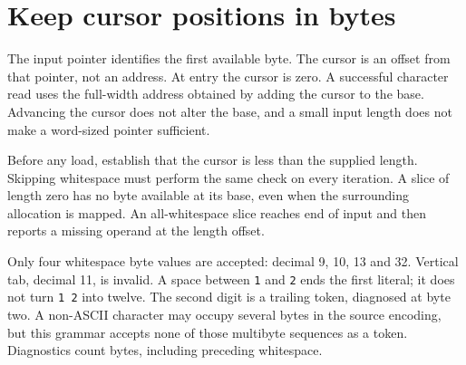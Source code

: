 \section{Keep cursor positions in bytes}\label{expression-bytes}
The input pointer identifies the first available byte. The cursor is an offset
from that pointer, not an address. At entry the cursor is zero. A successful
character read uses the full-width address obtained by adding the cursor to the
base. Advancing the cursor does not alter the base, and a small input length does
not make a word-sized pointer sufficient.

Before any load, establish that the cursor is less than the supplied length.
Skipping whitespace must perform the same check on every iteration. A slice of
length zero has no byte available at its base, even when the surrounding allocation
is mapped. An all-whitespace slice reaches end of input and then reports a missing
operand at the length offset.

Only four whitespace byte values are accepted: decimal 9, 10, 13 and 32. Vertical
tab, decimal 11, is invalid. A space between \texttt{1} and \texttt{2} ends the
first literal; it does not turn \texttt{1 2} into twelve. The second digit is a
trailing token, diagnosed at byte two. A non-ASCII character may occupy several
bytes in the source encoding, but this grammar accepts none of those multibyte
sequences as a token. Diagnostics count bytes, including preceding whitespace.
